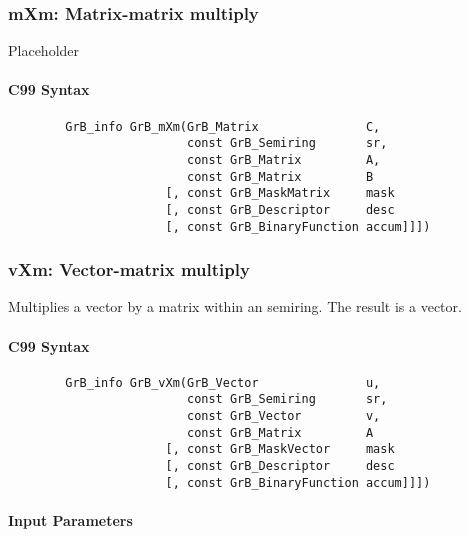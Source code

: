 \subsubsection{{\sf mXm}: Matrix-matrix multiply}

Placeholder


\paragraph{C99 Syntax}

\begin{verbatim}
        GrB_info GrB_mXm(GrB_Matrix               C,
                         const GrB_Semiring       sr,
                         const GrB_Matrix         A, 
                         const GrB_Matrix         B
                      [, const GrB_MaskMatrix     mask
                      [, const GrB_Descriptor     desc
                      [, const GrB_BinaryFunction accum]]])
\end{verbatim}


\subsubsection{{\sf vXm}: Vector-matrix multiply}

Multiplies a vector by a matrix within an semiring. The result is a vector.

\paragraph{C99 Syntax}

\begin{verbatim}
        GrB_info GrB_vXm(GrB_Vector               u,
                         const GrB_Semiring       sr,
                         const GrB_Vector         v, 
                         const GrB_Matrix         A
                      [, const GrB_MaskVector     mask
                      [, const GrB_Descriptor     desc
                      [, const GrB_BinaryFunction accum]]])
\end{verbatim}

\paragraph{Input Parameters}

